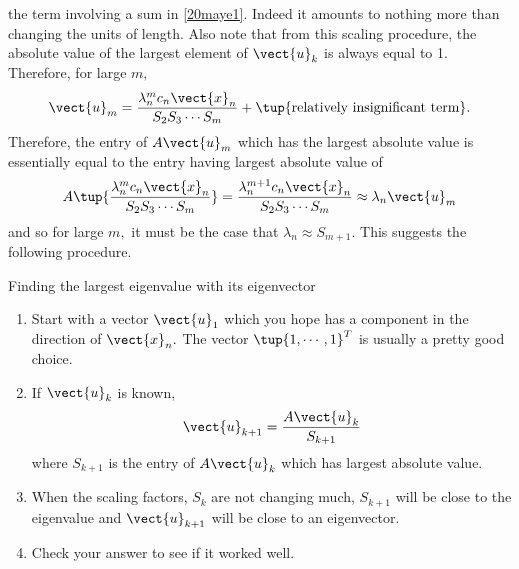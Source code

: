 the term involving a sum in \ref{20maye1}. Indeed it amounts to nothing more
than changing the units of length. Also note that from this scaling
procedure, the absolute value of the largest element of $\vect{u}_{k}$ is
always equal to 1. Therefore, for large $m,$
\begin{equation*}
\vect{u}_{m}=\vspace{0.05in}\frac{\lambda _{n}^{m}c_{n}\vect{x}_{n}}{S_{2}S_{3}\cdots S_{m}}+\tup{\text{relatively insignificant term}} .
\end{equation*}
Therefore, the entry of $A\vect{u}_{m}$ which has the largest absolute value
is essentially equal to the entry having largest absolute value of 
\begin{equation*}
A\tup{\vspace{0.05in}\frac{\lambda _{n}^{m}c_{n}\vect{x}_{n}}{S_{2}S_{3}\cdots S_{m}}} =\vspace{0.05in}\frac{\lambda _{n}^{m+1}c_{n}
\vect{x}_{n}}{S_{2}S_{3}\cdots S_{m}}\approx \lambda _{n}\vect{u}_{m}
\end{equation*}%
and so for large $m,$ it must be the case that $\lambda _{n}\approx S_{m+1}.$
This suggests the following procedure.

\begin{procedure}{Finding the largest eigenvalue with its eigenvector}{}
\begin{enumerate}
\item Start with a vector $\vect{u}_{1}$ which you hope has a component in
the direction of $\vect{x}_{n}.$ The vector $\tup{1,\cdots ,1} ^{T}$
is usually a pretty good choice.

\item If $\vect{u}_{k}$ is known, 
\begin{equation*}
\vect{u}_{k+1}=\frac{A\vect{u}_{k}}{S_{k+1}}
\end{equation*}
where $S_{k+1}$ is the entry of $A\vect{u}_{k}$ which has largest absolute
value.

\item When the scaling factors, $S_{k}$ are not changing much, $S_{k+1}$
will be close to the eigenvalue and $\vect{u}_{k+1}$ will be close to an
eigenvector.

\item Check your answer to see if it worked well.
\end{enumerate}
\end{procedure}

